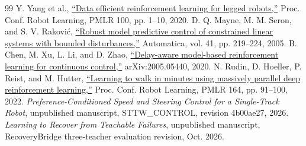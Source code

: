 \begin{thebibliography}{99}
 Y. Yang et al., \href{https://proceedings.mlr.press/v100/yang20a.html}{``Data efficient reinforcement learning for legged robots,''} Proc. Conf. Robot Learning, PMLR 100, pp. 1--10, 2020.
 D. Q. Mayne, M. M. Seron, and S. V. Rakovi\'c, \href{https://doi.org/10.1016/j.automatica.2004.08.019}{``Robust model predictive control of constrained linear systems with bounded disturbances,''} Automatica, vol. 41, pp. 219--224, 2005.
 B. Chen, M. Xu, L. Li, and D. Zhao, \href{https://arxiv.org/abs/2005.05440}{``Delay-aware model-based reinforcement learning for continuous control,''} arXiv:2005.05440, 2020.
 N. Rudin, D. Hoeller, P. Reist, and M. Hutter, \href{https://proceedings.mlr.press/v164/rudin22a.html}{``Learning to walk in minutes using massively parallel deep reinforcement learning,''} Proc. Conf. Robot Learning, PMLR 164, pp. 91--100, 2022.
 \emph{Preference-Conditioned Speed and Steering Control for a Single-Track Robot}, unpublished manuscript, STTW\_CONTROL, revision 4b00ae27, 2026.
 \emph{Learning to Recover from Teachable Failures}, unpublished manuscript, RecoveryBridge three-teacher evaluation revision, Oct. 2026.
\end{thebibliography}
